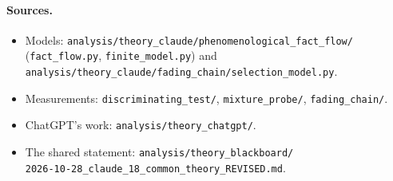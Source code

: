 \documentclass[10pt,a4paper]{article}
\theoremstyle{definition}
\begin{document}
\paragraph{Sources.}
\begin{itemize}
\item Models: \nolinkurl{analysis/theory_claude/phenomenological_fact_flow/} (\nolinkurl{fact_flow.py},
  \nolinkurl{finite_model.py}) and \nolinkurl{analysis/theory_claude/fading_chain/selection_model.py}.
\item Measurements: \nolinkurl{discriminating_test/}, \nolinkurl{mixture_probe/}, \nolinkurl{fading_chain/}.
\item ChatGPT's work: \nolinkurl{analysis/theory_chatgpt/}.
\item The shared statement: \nolinkurl{analysis/theory_blackboard/}\\ \nolinkurl{2026-10-28_claude_18_common_theory_REVISED.md}.
\end{itemize}
\end{document}
